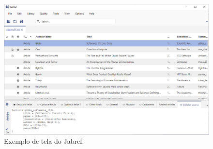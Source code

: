 \begin{figure}
    \centering
    \includegraphics[width=0.7\linewidth]{Images/jabref}
    \caption{Exemplo de tela do Jabref.}
    \label{fig:jabref}
\end{figure}  







